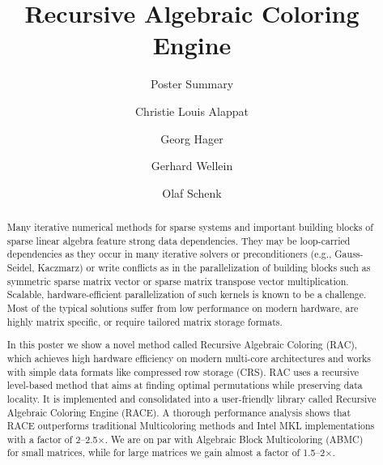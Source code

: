 \documentclass[sigplan, review]{acmart}
\begin{document}
\title[RACE]{Recursive Algebraic Coloring Engine}
\subtitle{Poster Summary}

\author{Christie Louis Alappat}

\author{Georg Hager}

\author{Gerhard Wellein}

\author{Olaf Schenk}

\renewcommand{\shortauthors}{C. Alappat et al.}



\begin{abstract}
Many iterative numerical methods for sparse systems and important building blocks of sparse linear algebra feature strong data dependencies. They may be loop-carried dependencies as they occur in many iterative solvers or preconditioners (e.g., Gauss-Seidel, Kaczmarz) or write conflicts as in the parallelization of building blocks such as symmetric sparse matrix vector or sparse matrix transpose vector multiplication. Scalable, hardware-efficient parallelization of such kernels is known to be a challenge. Most of the typical solutions suffer from low performance on modern hardware, are highly matrix specific, or require tailored matrix storage formats.

In this poster we show a novel method called Recursive Algebraic Coloring (RAC), which achieves high hardware efficiency on modern multi-core architectures and works with simple data formats like compressed row storage (CRS). RAC uses a recursive level-based method that aims at finding optimal permutations while preserving data locality. It is implemented and consolidated into a user-friendly library called Recursive Algebraic Coloring Engine (RACE). A thorough performance analysis shows that RACE outperforms traditional Multicoloring methods and Intel MKL implementations with a factor of 2--2.5$\times$. We are on par with Algebraic Block Multicoloring (ABMC) for small matrices, while for large matrices we gain almost a factor of 1.5--2$\times$.
\end{abstract}
\end{document}
